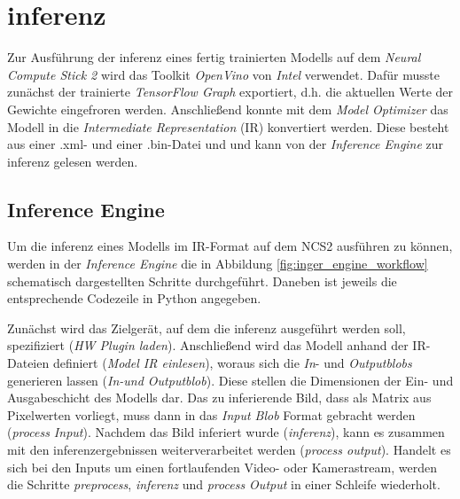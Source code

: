 \section{\Gls{inferenz}}\label{sec:inferenz}

Zur Ausführung der \Gls{inferenz} eines fertig trainierten 
Modells auf dem \textit{Neural Compute Stick 2} 
wird das Toolkit \textit{OpenVino} von \textit{Intel} verwendet.
Dafür musste zunächst der trainierte \textit{TensorFlow Graph} 
exportiert, d.h. die aktuellen Werte der Gewichte 
eingefroren werden.
Anschließend konnte mit dem \textit{Model Optimizer}
das Modell in die \textit{Intermediate Representation} (IR)
konvertiert werden.
Diese besteht aus einer .xml- und einer .bin-Datei und 
und kann von der \textit{Inference Engine}
zur \Gls{inferenz} gelesen werden.


\subsection*{Inference Engine}

Um die \Gls{inferenz} eines Modells im IR-Format 
auf dem NCS2 ausführen zu können, werden 
in der \textit{Inference Engine} die in Abbildung 
\ref{fig:inger_engine_workflow} schematisch
dargestellten Schritte durchgeführt.
Daneben ist jeweils die entsprechende 
Codezeile in Python angegeben.

Zunächst wird das Zielgerät, auf dem 
die \Gls{inferenz} ausgeführt werden soll,
spezifiziert (\textit{HW Plugin laden}).
Anschließend wird das Modell anhand der 
IR-Dateien definiert (\textit{Model IR einlesen}),
woraus sich die \textit{In}- und \textit{Outputblobs}
 generieren lassen (\textit{In-und Outputblob}). 
Diese stellen die Dimensionen der Ein- und Ausgabeschicht
des Modells dar.
Das zu inferierende Bild,
dass als Matrix aus Pixelwerten 
vorliegt, muss dann in das \textit{Input Blob}
Format gebracht werden (\textit{process Input}).
Nachdem das Bild inferiert wurde (\textit{\Gls{inferenz}}),
kann es zusammen mit den \Gls{inferenz}ergebnissen 
weiterverarbeitet werden (\textit{process
output}).
Handelt es sich bei den Inputs 
um einen fortlaufenden Video- oder 
Kamerastream, werden die Schritte 
\textit{preprocess}, \textit{\Gls{inferenz}} und 
\textit{process Output} in einer Schleife wiederholt.



